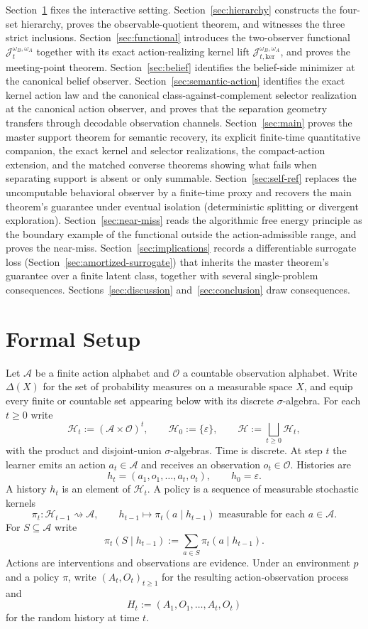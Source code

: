 \documentclass[11pt]{article}
\theoremstyle{definition}
\theoremstyle{remark}
\newcommand{\Acal}{\mathcal{A}}
\newcommand{\Ocal}{\mathcal{O}}
\newcommand{\Hcal}{\mathcal{H}}
\begin{document}
Section~\ref{sec:setup} fixes the interactive setting. Section~\ref{sec:hierarchy} constructs the four-set hierarchy, proves the observable-quotient theorem, and witnesses the three strict inclusions. Section~\ref{sec:functional} introduces the two-observer functional $\mathcal J_t^{\omega_B,\omega_A}$ together with its exact action-realizing kernel lift $\mathcal J_{t,\mathrm{ker}}^{\omega_B,\omega_A}$, and proves the meeting-point theorem. Section~\ref{sec:belief} identifies the belief-side minimizer at the canonical belief observer. Section~\ref{sec:semantic-action} identifies the exact kernel action law and the canonical class-against-complement selector realization at the canonical action observer, and proves that the separation geometry transfers through decodable observation channels. Section~\ref{sec:main} proves the master support theorem for semantic recovery, its explicit finite-time quantitative companion, the exact kernel and selector realizations, the compact-action extension, and the matched converse theorems showing what fails when separating support is absent or only summable. Section~\ref{sec:self-ref} replaces the uncomputable behavioral observer by a finite-time proxy and recovers the main theorem's guarantee under eventual isolation (deterministic splitting or divergent exploration). Section~\ref{sec:near-miss} reads the algorithmic free energy principle as the boundary example of the functional outside the action-admissible range, and proves the near-miss. Section~\ref{sec:implications} records a differentiable surrogate loss (Section~\ref{sec:amortized-surrogate}) that inherits the master theorem's guarantee over a finite latent class, together with several single-problem consequences. Sections~\ref{sec:discussion} and~\ref{sec:conclusion} draw consequences.

\section{Formal Setup}
\label{sec:setup}

Let $\Acal$ be a finite action alphabet and $\Ocal$ a countable observation alphabet. Write $\Delta(X)$ for the set of probability measures on a measurable space $X$, and equip every finite or countable set appearing below with its discrete $\sigma$-algebra. For each $t\ge 0$ write
\[
\Hcal_t:=(\Acal\times\Ocal)^t,
\qquad
\Hcal_0:=\{\varepsilon\},
\qquad
\Hcal:=\bigsqcup_{t\ge 0}\Hcal_t,
\]
with the product and disjoint-union $\sigma$-algebras. Time is discrete. At step $t$ the learner emits an action $a_t\in\Acal$ and receives an observation $o_t\in\Ocal$. Histories are
\[
h_t=(a_1,o_1,\dots,a_t,o_t),
\qquad
h_0=\varepsilon.
\]
A history $h_t$ is an element of $\Hcal_t$. A policy is a sequence of measurable stochastic kernels
\[
\pi_t:\Hcal_{t-1}\rightsquigarrow \Acal,
\qquad
h_{t-1}\longmapsto \pi_t(a\mid h_{t-1})\text{ measurable for each }a\in\Acal.
\]
For $S\subseteq\Acal$ write
\[
\pi_t(S\mid h_{t-1}):=\sum_{a\in S}\pi_t(a\mid h_{t-1}).
\]
Actions are interventions and observations are evidence. Under an environment $p$ and a policy $\pi$, write $(A_t,O_t)_{t\ge 1}$ for the resulting action-observation process and
\[
H_t:=(A_1,O_1,\dots,A_t,O_t)
\]
for the random history at time $t$.
\end{document}

